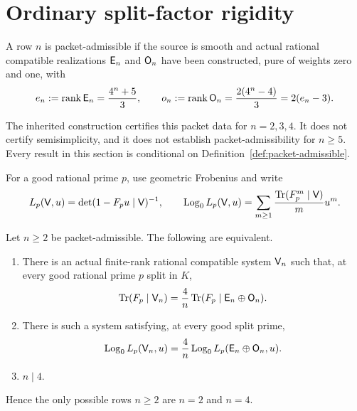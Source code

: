 \section{Ordinary split-factor rigidity}
\label{sec:denominator}

\begin{definition}
\label{def:packet-admissible}
A row \(n\) is packet-admissible if the source is smooth and actual
rational compatible realizations \(\mathsf E_n\) and \(\mathsf O_n\) have been
constructed, pure of weights zero and one, with
\begin{equation}
e_n:=\operatorname{rank}\mathsf E_n=\frac{4^n+5}{3},\qquad
o_n:=\operatorname{rank}\mathsf O_n=\frac{2(4^n-4)}{3}=2(e_n-3).
\label{eq:rail-ranks}
\end{equation}
\end{definition}

The inherited construction certifies this packet data for
\(n=2,3,4\).  It does not certify semisimplicity, and it does not establish
packet-admissibility for \(n\ge5\).  Every result in this section is
conditional on Definition~\ref{def:packet-admissible}.

For a good rational prime \(p\), use geometric Frobenius and write
\[
L_p(\mathsf V,u)
=\det(1-F_pu\mid\mathsf V)^{-1},
\qquad
\operatorname{Log}_0 L_p(\mathsf V,u)
=\sum_{m\ge1}\frac{\operatorname{Tr}(F_p^m\mid\mathsf V)}{m}u^m.
\]

\begin{theorem}
\label{thm:denominator}
Let \(n\ge2\) be packet-admissible.  The following are equivalent.
\begin{enumerate}[label=\textup{(\roman*)},leftmargin=*]
\item There is an actual finite-rank rational compatible system
\(\mathsf V_n\) such that, at every good rational prime \(p\) split in \(K\),
\[
\operatorname{Tr}(F_p\mid\mathsf V_n)
=\frac4n\operatorname{Tr}(F_p\mid\mathsf E_n\oplus\mathsf O_n).
\]
\item There is such a system satisfying, at every good split prime,
\[
\operatorname{Log}_0 L_p(\mathsf V_n,u)
=\frac4n\operatorname{Log}_0 L_p(\mathsf E_n\oplus\mathsf O_n,u).
\]
\item \(n\mid4\).
\end{enumerate}
Hence the only possible rows \(n\ge2\) are \(n=2\) and \(n=4\).
\end{theorem}

